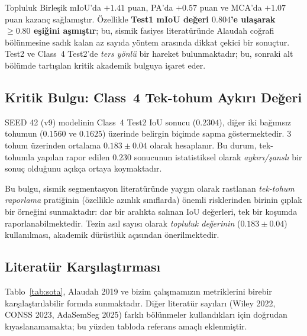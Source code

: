 \documentclass[conference,a4paper,10pt]{IEEEtran}
\begin{document}
Topluluk Birleşik mIoU'da $+1.41$ puan, PA'da $+0.57$ puan ve MCA'da
$+1.07$ puan kazanç sağlamıştır. Özellikle \textbf{Test1 mIoU değeri
$0.804$'e ulaşarak $\geq 0.80$ eşiğini aşmıştır}; bu, sismik fasiyes
literatüründe Alaudah coğrafi bölünmesine sadık kalan az sayıda yöntem
arasında dikkat çekici bir sonuçtur. Test2 ve Class~4 Test2'de
\emph{ters yönlü} bir hareket bulunmaktadır; bu, sonraki alt bölümde
tartışılan kritik akademik bulguya işaret eder.

\subsection{\textbf{Kritik Bulgu}: Class~4 Tek-tohum Aykırı Değeri}
\label{sec:c4_aykiri}

SEED 42 (v9) modelinin Class~4 Test2 IoU sonucu ($0.2304$), diğer iki
bağımsız tohumun ($0.1560$ ve $0.1625$) üzerinde belirgin biçimde sapma
göstermektedir. 3 tohum üzerinden ortalama $0.183 \pm 0.04$ olarak hesaplanır.
Bu durum, tek-tohumla yapılan rapor edilen $0.230$ sonucunun istatistiksel
olarak \emph{aykırı/şanslı} bir sonuç olduğunu açıkça ortaya koymaktadır.

Bu bulgu, sismik segmentasyon literatüründe yaygın olarak rastlanan
\emph{tek-tohum raporlama} pratiğinin (özellikle azınlık sınıflarda) önemli
risklerinden birinin çıplak bir örneğini sunmaktadır: dar bir aralıkta
salınan IoU değerleri, tek bir koşumda %
raporlanabilmektedir. Tezin asıl sayısı olarak \emph{topluluk değerinin}
($0.183 \pm 0.04$) kullanılması, akademik dürüstlük açısından önerilmektedir.

\subsection{Literatür Karşılaştırması}

Tablo~\ref{tab:sota}, Alaudah 2019 ve bizim çalışmamızın metriklerini birebir
karşılaştırılabilir formda sunmaktadır. Diğer literatür sayıları (Wiley 2022,
CONSS 2023, AdaSemSeg 2025) farklı bölünmeler kullandıkları için doğrudan
kıyaslanamamakta; bu yüzden tabloda referans amaçlı eklenmiştir.
\end{document}
